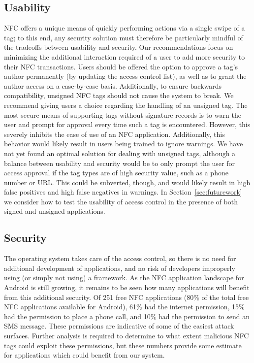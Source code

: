 \documentclass[12pt]{article}
\begin{document}
\subsection{Usability}
NFC offers a unique means of quickly performing actions via a single swipe of a tag; to this end, any security solution must therefore be particularly mindful of the tradeoffs between usability and security.
Our recommendations focus on minimizing the additional interaction required of a user to add more security to their NFC transactions.
Users should be offered the option to approve a tag's author permanently (by updating the access control list), as well as to grant the author access on a case-by-case basis.
Additionally, to ensure backwards compatibility, unsigned NFC tags should not cause the system to break.
We recommend giving users a choice regarding the handling of an unsigned tag.
The most secure means of supporting tags without signature records is to warn the user and prompt for approval every time such a tag is encountered.
However, this severely inhibits the ease of use of an NFC application.
Additionally, this behavior would likely result in users being trained to ignore warnings.
We have not yet found an optimal solution for dealing with unsigned tags, although a balance between usability and security would be to only prompt the user for access approval if the tag types are of high security value, such as a phone number or URL.
This could be subverted, though, and would likely result in high false positives and high false negatives in warnings.
In Section~\ref{sec:futurework} we consider how to test the usability of access control in the presence of both signed and unsigned applications.

\subsection{Security}
The operating system takes care of the access control, so there is no need for additional development of applications, and no risk of developers improperly using (or simply not using) a framework.
As the NFC application landscape for Android is still growing, it remains to be seen how many applications will benefit from this additional security.
Of 251 free NFC applications (80\% of the total free NFC applications available for Android), 61\% had the internet permission, 15\% had the permission to place a phone call, and 10\% had the permission to send an SMS message.
These permissions are indicative of some of the easiest attack surfaces.
Further analysis is required to determine to what extent malicious NFC tags could exploit these permissions, but these numbers provide some estimate for applications which could benefit from our system.
\end{document}
